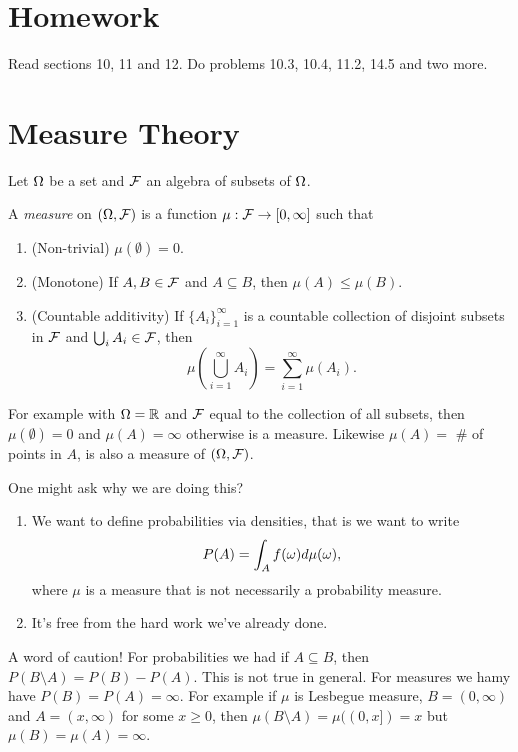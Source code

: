 \section{Homework}
Read sections 10, 11 and 12.
Do problems 10.3, 10.4, 11.2, 14.5 and two more.
\section{Measure Theory}
Let ${{\Omega}}$ be a set and ${\mathcal{F}}$ an algebra of subsets of ${{\Omega}}$.

\begin{defn}
    A \emph{measure} on $({{\Omega}},{\mathcal{F}})$ is a function $\mu : {\mathcal{F}} \to [0,\infty]$ such that 
    \begin{enumerate}
        \item (Non-trivial) $\mu(\emptyset)=0$.
        \item (Monotone) If $A,B \in {\mathcal{F}}$ and $A\subseteq B$, then $\mu(A) \le \mu(B)$.
        \item (Countable additivity) If $\{A_i\}_{i=1}^\infty$ is a countable collection of disjoint subsets in ${\mathcal{F}}$ and $\bigcup_i A_i \in {\mathcal{F}}$, then
        \[\mu\left(\bigcup_{i=1}^\infty A_i\right)=\sum_{i=1}^\infty \mu(A_i).\]
    \end{enumerate}
\end{defn}
For example with ${{\Omega}} ={\mathbb R}$ and ${\mathcal{F}}$ equal to the collection of all subsets, then $\mu(\emptyset) = 0$ and $\mu(A) = \infty$ otherwise is a measure. Likewise $\mu(A) = $ \# of points in $A$, is also a measure of $({{\Omega}},{\mathcal{F}})$. 

One might ask why we are doing this?
\begin{enumerate}
    \item We want to define probabilities via densities, that is we want to write
    \[P(A) = \int_A f({\omega})d\mu({\omega}), \]
    where $\mu$ is a measure that is not necessarily a probability measure.
    \item It's free from the hard work we've already done.
\end{enumerate}
A word of caution! For probabilities we had if $A \subseteq B$, then $P(B \setminus A) = P(B) - P(A)$. This is not true in general. For measures we hamy have $P(B)=P(A)=\infty$. For example if $\mu$ is Lesbegue measure, $B = (0,\infty)$ and $A = (x,\infty)$ for some $x \ge 0$, then $\mu(B \setminus A) = \mu((0,x]) = x$ but $\mu(B)=\mu(A) = \infty$.

